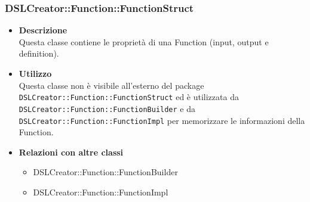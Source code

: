  \subsubsection{DSLCreator::Function::FunctionStruct}
                    \begin{itemize}
                        \item \textbf{Descrizione} \hfill \\
                          Questa classe contiene le proprietà di una Function (input, output e definition).
                        \item \textbf{Utilizzo} \hfill \\
                          Questa classe non è visibile all'esterno del package \texttt{DSLCreator::Function::FunctionStruct} ed è utilizzata da \texttt{DSLCreator::Function::FunctionBuilder} e da \texttt{DSLCreator::Fun\-ction::FunctionImpl} per memorizzare le informazioni della Function.
                        \item \textbf{Relazioni con altre classi}
                            \begin{itemize}
                              \item DSLCreator::Function::FunctionBuilder
                              \item DSLCreator::Function::FunctionImpl
                            \end{itemize}
                    \end{itemize}  
